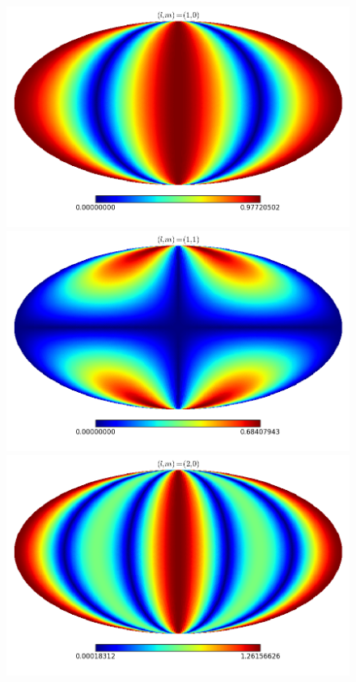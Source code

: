 \documentclass[11pt, a4paper,oneside,openright]{book}
\numberwithin{equation}{section}
\begin{document}
\begin{figure}
\begin{center}
\includegraphics[scale=0.3]{Fourier/(1,0).png}
\includegraphics[scale=0.3]{Fourier/(1,1).png}
\includegraphics[scale=0.3]{Fourier/(2,0).png}

\end{center}
\end{figure}
\end{document}

